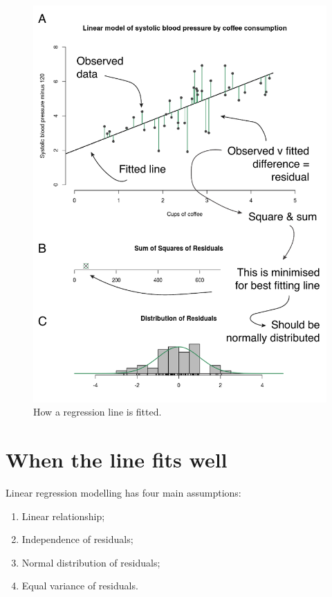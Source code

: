 \documentclass[12pt,]{krantz}
\providecommand{\tightlist}{%
  \setlength{\itemsep}{0pt}\setlength{\parskip}{0pt}}
\theoremstyle{definition}
\theoremstyle{definition}
\theoremstyle{definition}
\theoremstyle{remark}
\begin{document}
\begin{figure}
\centering
\includegraphics{images/chapter07/2_residuals.pdf}
\caption{\label{fig:chap07-fig-residuals}How a regression line is fitted.}
\end{figure}

\hypertarget{when-the-line-fits-well}{%
\section{When the line fits well}\label{when-the-line-fits-well}}

Linear regression modelling has four main assumptions:

\begin{enumerate}
\def\labelenumi{\arabic{enumi}.}
\tightlist
\item
  Linear relationship;
\item
  Independence of residuals;
\item
  Normal distribution of residuals;
\item
  Equal variance of residuals.
\end{enumerate}
\end{document}
